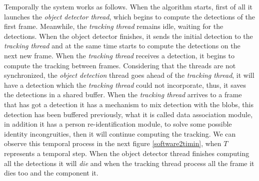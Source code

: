

Temporally the system works as follows. When the algorithm starts, first of all it launches the \textit{object detector thread}, which begins to compute the detections of the first frame. Meanwhile, the \textit{tracking thread} remains idle, waiting for the detections. When the object detector finishes, it sends the initial detection to the \textit{tracking thread} and at the same time starts to compute the detections on the next new frame. When the \textit{tracking thread} receives a detection, it begins to compute the tracking between frames. Considering that the threads are not synchronized, the \textit{object detection} thread goes ahead of the \textit{tracking thread}, it will have a detection which the \textit{tracking thread} could not incorporate, thus, it saves the detections in a shared buffer. When the \textit{tracking thread} arrives to a frame that has got a detection it has a mechanism to mix detection with the blobs, this detection has been buffered previously, what it is called data association module, in addition it has a person re-identification module, to solve some possible identity incongruities, then it will continue computing the tracking.
We can observe this temporal process in the next figure \ref{software2timin}, when $T$ represents a temporal step. When the object detector thread finishes computing all the detections it will \textit{die} and when the tracking thread process all the frame it dies too and the component it. 


